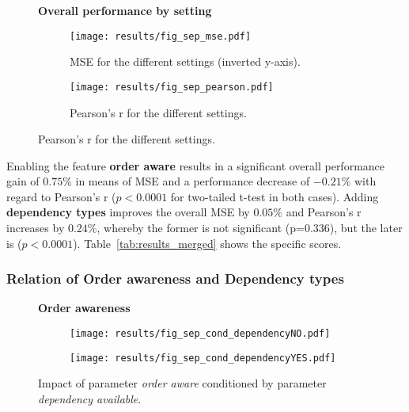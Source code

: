 \begin{figure}[htb!]
  \centering
  \textbf{Overall performance by setting}\par\medskip
  \begin{subfigure}{.5\textwidth}
    \centering
    \texttt{[image: results/fig\_sep\_mse.pdf]}
    \captionsetup{width=0.9\linewidth}
    \caption{MSE for the different settings (inverted y-axis).}
    \label{subfig:res_merged}
  \end{subfigure}%
  \begin{subfigure}{.5\textwidth}
    \centering
    \texttt{[image: results/fig\_sep\_pearson.pdf]}
    \captionsetup{width=0.9\linewidth}
    \caption{Pearson's r for the different settings.}
    \label{subfig:res_sep_mse}
  \end{subfigure}
  \label{fig:res_all}
\end{figure}

Enabling the feature \textbf{order aware} results in a significant overall performance gain of $0.75\%$ in means of \ac{MSE} and a performance decrease of $-0.21\%$ with regard to Pearson's r ($p<0.0001$ for two-tailed t-test  in both cases). Adding \textbf{dependency types} improves the overall \ac{MSE} by $0.05\%$ and Pearson's r increases by $0.24\%$, whereby the former is not significant (p=0.336), but the later is ($p<0.0001$). Table~\ref{tab:results_merged} shows the specific scores.


\subsubsection{Relation of Order awareness and Dependency types}

\begin{figure}[htb!]
  \centering
  \textbf{Order awareness}\par\medskip
  \begin{subfigure}{.5\textwidth}
    \centering
    \texttt{[image: results/fig\_sep\_cond\_dependencyNO.pdf]}
  \end{subfigure}%
  \begin{subfigure}{.5\textwidth}
    \centering
    \texttt{[image: results/fig\_sep\_cond\_dependencyYES.pdf]}
  \end{subfigure}
  \caption{Impact of parameter \textit{order aware} conditioned by parameter \textit{dependency available}.}
  \label{fig:fig_sep_order}
\end{figure}


